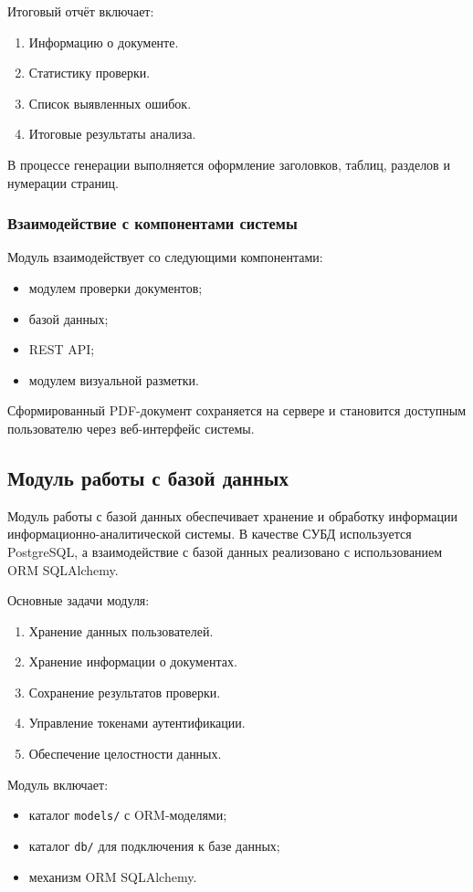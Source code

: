 Итоговый отчёт включает:
\begin{enumerate}
	\item Информацию о документе.
	\item Статистику проверки.
	\item Список выявленных ошибок.
	\item Итоговые результаты анализа.
\end{enumerate}

В процессе генерации выполняется оформление заголовков, таблиц, разделов и нумерации страниц.

\subsubsection{Взаимодействие с компонентами системы}

Модуль взаимодействует со следующими компонентами:
\begin{itemize}
	\item модулем проверки документов;
	\item базой данных;
	\item REST API;
	\item модулем визуальной разметки.
\end{itemize}

Сформированный PDF-документ сохраняется на сервере и становится доступным пользователю через веб-интерфейс системы.

\subsection{Модуль работы с базой данных}

Модуль работы с базой данных обеспечивает хранение и обработку информации информационно-аналитической системы. В качестве СУБД используется PostgreSQL, а взаимодействие с базой данных реализовано с использованием ORM SQLAlchemy.

Основные задачи модуля:
\begin{enumerate}
	\item Хранение данных пользователей.
	\item Хранение информации о документах.
	\item Сохранение результатов проверки.
	\item Управление токенами аутентификации.
	\item Обеспечение целостности данных.
\end{enumerate}

Модуль включает:
\begin{itemize}
	\item каталог \texttt{models/} с ORM-моделями;
	\item каталог \texttt{db/} для подключения к базе данных;
	\item механизм ORM SQLAlchemy.
\end{itemize}

